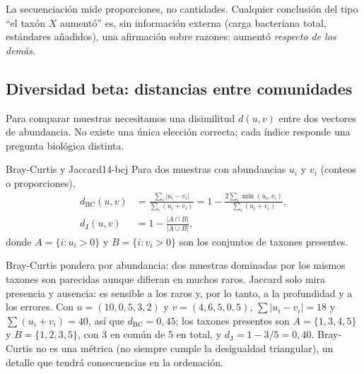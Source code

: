 \begin{ideaclave}
La secuenciación mide proporciones, no cantidades. Cualquier conclusión del tipo ``el taxón $X$ aumentó'' es, sin información externa (carga bacteriana total, estándares añadidos), una afirmación sobre razones: aumentó \emph{respecto de los demás}.
\end{ideaclave}

\subsection{Diversidad beta: distancias entre comunidades}

Para comparar muestras necesitamos una disimilitud $d(u,v)$ entre dos vectores de abundancia. No existe una única elección correcta; cada índice responde una pregunta biológica distinta.

\begin{definicion}{Bray-Curtis y Jaccard}{14-bcj}
Para dos muestras con abundancias $u_i$ y $v_i$ (conteos o proporciones),
\begin{align}
d_{\text{BC}}(u,v) &= \frac{\sum_i |u_i - v_i|}{\sum_i (u_i + v_i)} = 1 - \frac{2\sum_i \min(u_i, v_i)}{\sum_i (u_i+v_i)},\label{eq:14-bc}\\[3pt]
d_{\text{J}}(u,v) &= 1 - \frac{|A \cap B|}{|A \cup B|},\label{eq:14-jaccard}
\end{align}
donde $A=\{i: u_i>0\}$ y $B=\{i: v_i>0\}$ son los conjuntos de taxones presentes.
\end{definicion}

\begin{simbolos}
\end{simbolos}

Bray-Curtis pondera por abundancia: dos muestras dominadas por los mismos taxones son parecidas aunque difieran en muchos raros. Jaccard solo mira presencia y ausencia: es sensible a los raros y, por lo tanto, a la profundidad y a los errores. Con $u=(10,0,5,3,2)$ y $v=(4,6,5,0,5)$, $\sum|u_i-v_i| = 18$ y $\sum(u_i+v_i)=40$, así que $d_{\text{BC}} = 0{,}45$; los taxones presentes son $A=\{1,3,4,5\}$ y $B=\{1,2,3,5\}$, con 3 en común de 5 en total, y $d_{\text{J}} = 1 - 3/5 = 0{,}40$. Bray-Curtis no es una métrica (no siempre cumple la desigualdad triangular), un detalle que tendrá consecuencias en la ordenación.

